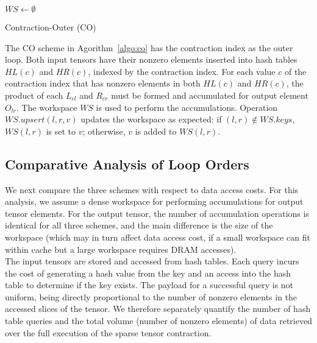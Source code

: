 \begin{algorithm}[h]
\DontPrintSemicolon
\LinesNumbered
$\mathit{WS} \gets \emptyset$ \;

\caption{Contraction-Outer (CO)\label{algo:co}}
\end{algorithm}

The CO scheme in Agorithm~\ref{algo:co} has the contraction index as the outer loop. Both input tensors have their nonzero elements inserted into hash tables $\mathit{HL}(c)$ and $\mathit{HR}(c)$, indexed by the contraction index. For each value $c$ of the contraction index that has nonzero elements in both $\mathit{HL}(c)$ and $\mathit{HR}(c)$, the product of each $L_{cl}$ and $R_{cr}$ must be formed and accumulated for output element $O_{lr}$. The workspace $\mathit{WS}$ is used to perform the accumulations. Operation $\mathit{WS}.\mathit{upsert}(l,r,v)$ updates the workspace as expected: if $(l,r) \notin \mathit{WS}.\mathit{keys}$, $\mathit{WS}(l,r)$ is set to $v$; otherwise, $v$ is added to $\mathit{WS}(l,r)$.

\subsection{Comparative Analysis of Loop Orders}
We next compare the three schemes with respect to data access costs. For this analysis, we assume a dense workspace for performing accumulations for output tensor elements. For the output tensor, the number of accumulation operations is identical for all three schemes, and the main difference is the size of the workspace (which may in turn affect data access cost, if a small workspace can fit within cache but a large workspace requires DRAM accesses).\\ 
 The input tensors are stored and accessed from hash tables. Each query incurs the cost of generating a hash value from the key and an access into the hash table to determine if the key exists. The payload for a successful query is not uniform, being directly proportional to the number of nonzero elements in the accessed slices of the tensor. We therefore separately quantify the number of hash table queries and the total volume (number of nonzero elements) of data retrieved over the full execution of the sparse tensor contraction. 

